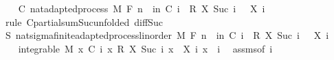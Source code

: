 \begin{isabellebody}
\ \ \isamarkupfalse%
\ C{\isacharprime}{\kern0pt}{\isacharprime}{\kern0pt}{\isacharcolon}{\kern0pt}\ nat{\isacharunderscore}{\kern0pt}adapted{\isacharunderscore}{\kern0pt}process\ M\ F\ {\isachardoublequoteopen}{\isasymlambda}n\ {\isasymxi}{\isachardot}{\kern0pt}\ {\isasymSum}i{\isacharless}{\kern0pt}n{\isachardot}{\kern0pt}\ C\ i\ {\isasymxi}\ {\isacharasterisk}{\kern0pt}\isactrlsub R\ {\isacharparenleft}{\kern0pt}X\ {\isacharparenleft}{\kern0pt}Suc\ i{\isacharparenright}{\kern0pt}\ {\isasymxi}\ {\isacharminus}{\kern0pt}\ X\ i\ {\isasymxi}{\isacharparenright}{\kern0pt}{\isachardoublequoteclose}\ \isamarkupfalse%
\ {\isacharparenleft}{\kern0pt}rule\ C{\isacharprime}{\kern0pt}{\isachardot}{\kern0pt}partial{\isacharunderscore}{\kern0pt}sum{\isacharunderscore}{\kern0pt}Suc{\isacharbrackleft}{\kern0pt}unfolded\ diff{\isacharunderscore}{\kern0pt}Suc{\isacharunderscore}{\kern0pt}{}{\isacharbrackright}{\kern0pt}{\isacharparenright}{\kern0pt}\isanewline
\ \ \isamarkupfalse%
\ S{\isacharcolon}{\kern0pt}\ nat{\isacharunderscore}{\kern0pt}sigma{\isacharunderscore}{\kern0pt}finite{\isacharunderscore}{\kern0pt}adapted{\isacharunderscore}{\kern0pt}process{\isacharunderscore}{\kern0pt}linorder\ M\ F\ {\isachardoublequoteopen}{\isacharparenleft}{\kern0pt}{\isasymlambda}n\ {\isasymxi}{\isachardot}{\kern0pt}\ {\isasymSum}i{\isacharless}{\kern0pt}n{\isachardot}{\kern0pt}\ C\ i\ {\isasymxi}\ {\isacharasterisk}{\kern0pt}\isactrlsub R\ {\isacharparenleft}{\kern0pt}X\ {\isacharparenleft}{\kern0pt}Suc\ i{\isacharparenright}{\kern0pt}\ {\isasymxi}\ {\isacharminus}{\kern0pt}\ X\ i\ {\isasymxi}{\isacharparenright}{\kern0pt}{\isacharparenright}{\kern0pt}{\isachardoublequoteclose}\ \isacommand{{\isachardot}{\kern0pt}{\isachardot}{\kern0pt}}\isamarkupfalse%
\isanewline
\ \ \isamarkupfalse%
\ {\isachardoublequoteopen}integrable\ M\ {\isacharparenleft}{\kern0pt}{\isasymlambda}x{\isachardot}{\kern0pt}\ C\ i\ x\ {\isacharasterisk}{\kern0pt}\isactrlsub R\ {\isacharparenleft}{\kern0pt}X\ {\isacharparenleft}{\kern0pt}Suc\ i{\isacharparenright}{\kern0pt}\ x\ {\isacharminus}{\kern0pt}\ X\ i\ x{\isacharparenright}{\kern0pt}{\isacharparenright}{\kern0pt}{\isachardoublequoteclose}\ \ i\ \isamarkupfalse%
\ assms{\isacharparenleft}{\kern0pt}{}{\isacharcomma}{\kern0pt}{}{\isacharparenright}{\kern0pt}{\isacharbrackleft}{\kern0pt}of\ i{\isacharbrackright}{\kern0pt}\ \isamarkupfalse%

\end{isabellebody}
